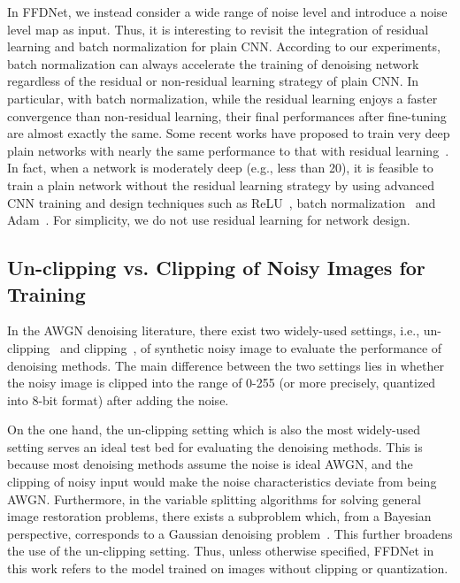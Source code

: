 \documentclass[journal]{IEEEtran}
\begin{document}
In FFDNet, we instead consider a wide range of noise level and introduce a noise level map as input. Thus, it is interesting to revisit the integration of residual learning and batch normalization for plain CNN.
According to our experiments, batch normalization can always accelerate the training of denoising network regardless of the residual or non-residual learning strategy of plain CNN.
In particular, with batch normalization, while the residual learning enjoys a faster convergence than non-residual learning, their final performances after fine-tuning are almost exactly the same.
Some recent works have proposed to train very deep plain networks with nearly the same performance to that with residual learning~\cite{Zagoruyko2017diracnets,xie2017all}.
In fact, when a network is moderately deep (e.g., less than 20), it is feasible to train a plain network without the residual learning strategy by using advanced CNN training and design techniques such as ReLU~\cite{krizhevsky2012imagenet}, batch normalization~\cite{ioffe2015batch} and Adam~\cite{kingma2014adam}.
For simplicity, we do not use residual learning for network design.

\subsection{Un-clipping  vs. Clipping of Noisy Images for Training}\label{section_clip}

In the AWGN denoising literature, there exist two widely-used settings, i.e., un-clipping~\cite{dabov2007image,gu2014weighted,burger2012image,chen2015trainable} and clipping~\cite{schmidt2014shrinkage,Vemulapalli_2016_CVPR}, of synthetic noisy image to evaluate the performance of denoising methods.
The main difference between the two settings lies in whether the noisy image is clipped into the range of 0-255 (or more precisely, quantized into 8-bit format) after adding the noise.


On the one hand, the un-clipping setting which is also the most widely-used setting serves an ideal test bed for evaluating
the denoising methods. This is because most denoising methods assume the noise is ideal AWGN, and
the clipping of noisy input would make the noise characteristics deviate from being AWGN.
Furthermore, in the variable splitting algorithms for solving general image restoration problems, there exists a subproblem which, from a Bayesian perspective, corresponds to a Gaussian denoising problem~\cite{chan2016plug,zhang2017learning}. This further broadens the use of the un-clipping setting.
Thus, unless otherwise specified, FFDNet in this work refers to the model trained on images without clipping or quantization.
\end{document}
